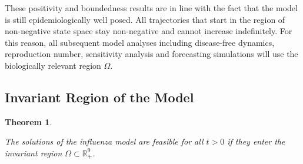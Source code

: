 \documentclass[12pt,a4paper]{article}
\newtheorem{theorem}{Theorem}[section]
\theoremstyle{definition}
\theoremstyle{remark}
\begin{document}
These positivity and boundedness results are in line with the fact that the model is still epidemiologically well posed. All trajectories that start in the region of non-negative state space stay non-negative and cannot increase indefinitely. For this reason, all subsequent model analyses including disease-free dynamics, reproduction number, sensitivity analysis and forecasting simulations will use the biologically relevant region $\Omega$.






\subsection{Invariant Region of the Model}

\begin{theorem}
\label{thm:influenza_invariant}

The solutions of the influenza model are feasible for all $t>0$ if they
enter the invariant region $\Omega\subset\mathbb{R}_{+}^{9}$.
\end{theorem}
\end{document}
